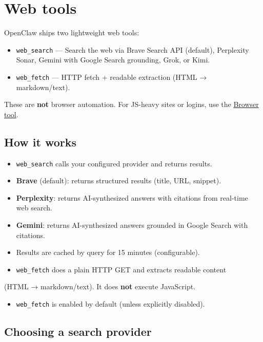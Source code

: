\section{Web tools}


OpenClaw ships two lightweight web tools:

\begin{itemize}
  \item \texttt{web\_search} — Search the web via Brave Search API (default), Perplexity Sonar, Gemini with Google Search grounding, Grok, or Kimi.
  \item \texttt{web\_fetch} — HTTP fetch + readable extraction (HTML → markdown/text).
\end{itemize}


These are \textbf{not} browser automation. For JS-heavy sites or logins, use the
\href{/tools/browser}{Browser tool}.

\subsection{How it works}


\begin{itemize}
  \item \texttt{web\_search} calls your configured provider and returns results.
  \item \textbf{Brave} (default): returns structured results (title, URL, snippet).
  \item \textbf{Perplexity}: returns AI-synthesized answers with citations from real-time web search.
  \item \textbf{Gemini}: returns AI-synthesized answers grounded in Google Search with citations.
  \item Results are cached by query for 15 minutes (configurable).
  \item \texttt{web\_fetch} does a plain HTTP GET and extracts readable content
\end{itemize}

(HTML → markdown/text). It does \textbf{not} execute JavaScript.
\begin{itemize}
  \item \texttt{web\_fetch} is enabled by default (unless explicitly disabled).
\end{itemize}


\subsection{Choosing a search provider}



